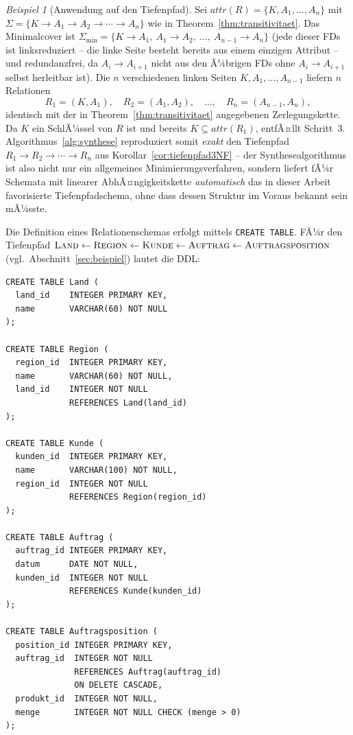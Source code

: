 ﻿\documentclass[a4paper,12pt]{report}
\theoremstyle{definition}
\theoremstyle{remark}
\newtheorem{example}{Beispiel}[chapter]
\newcommand{\att}{\mathit{attr}}
\begin{document}
\begin{example}[Anwendung auf den Tiefenpfad]
\label{ex:synthese-tiefenpfad}
Sei $\att(R)=\{K,A_1,\ldots,A_n\}$ mit $\Sigma=\{K\to A_1\to A_2\to
\cdots\to A_n\}$ wie in Theorem~\ref{thm:transitivitaet}. Das
Minimalcover ist
$\Sigma_{\min}=\{K\to A_1,\ A_1\to A_2,\ \ldots,\ A_{n-1}\to A_n\}$
(jede dieser FDs ist linksreduziert -- die linke Seite besteht bereits
aus einem einzigen Attribut -- und redundanzfrei, da $A_i\to A_{i+1}$
nicht aus den Ã¼brigen FDs ohne $A_i\to A_{i+1}$ selbst herleitbar ist).
Die $n$ verschiedenen linken Seiten $K,A_1,\ldots,A_{n-1}$ liefern $n$
Relationen
\[
  R_1=(K,A_1),\quad R_2=(A_1,A_2),\quad\ldots,\quad
  R_n=(A_{n-1},A_n),
\]
identisch mit der in Theorem~\ref{thm:transitivitaet} angegebenen
Zerlegungskette. Da $K$ ein SchlÃ¼ssel von $R$ ist und bereits
$K\subseteq\att(R_1)$, entfÃ¤llt Schritt~3. Algorithmus~\ref{alg:synthese}
reproduziert somit \emph{exakt} den Tiefenpfad
$R_1\to R_2\to\cdots\to R_n$ aus
Korollar~\ref{cor:tiefenpfad3NF} -- der Synthesealgorithmus ist also
nicht nur ein allgemeines Minimierungsverfahren, sondern liefert fÃ¼r
Schemata mit linearer AbhÃ¤ngigkeitskette \emph{automatisch} das in
dieser Arbeit favorisierte Tiefenpfadschema, ohne dass dessen Struktur
im Voraus bekannt sein mÃ¼sste.
\end{example}


\label{sec:ddl}

Die Definition eines Relationenschemas erfolgt mittels \texttt{CREATE
TABLE}. FÃ¼r den Tiefenpfad
$\textsc{Land} \leftarrow \textsc{Region} \leftarrow \textsc{Kunde}
\leftarrow \textsc{Auftrag} \leftarrow \textsc{Auftragsposition}$
(vgl.\ Abschnitt~\ref{sec:beispiel}) lautet die DDL:

\begin{lstlisting}
CREATE TABLE Land (
  land_id    INTEGER PRIMARY KEY,
  name       VARCHAR(60) NOT NULL
);

CREATE TABLE Region (
  region_id  INTEGER PRIMARY KEY,
  name       VARCHAR(60) NOT NULL,
  land_id    INTEGER NOT NULL
             REFERENCES Land(land_id)
);

CREATE TABLE Kunde (
  kunden_id  INTEGER PRIMARY KEY,
  name       VARCHAR(100) NOT NULL,
  region_id  INTEGER NOT NULL
             REFERENCES Region(region_id)
);

CREATE TABLE Auftrag (
  auftrag_id INTEGER PRIMARY KEY,
  datum      DATE NOT NULL,
  kunden_id  INTEGER NOT NULL
             REFERENCES Kunde(kunden_id)
);

CREATE TABLE Auftragsposition (
  position_id INTEGER PRIMARY KEY,
  auftrag_id  INTEGER NOT NULL
              REFERENCES Auftrag(auftrag_id)
              ON DELETE CASCADE,
  produkt_id  INTEGER NOT NULL,
  menge       INTEGER NOT NULL CHECK (menge > 0)
);
\end{lstlisting}
\end{document}
